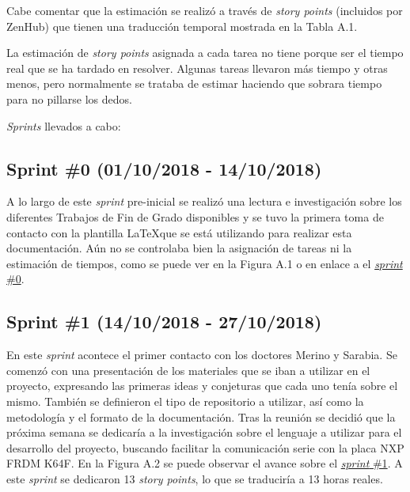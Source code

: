 Cabe comentar que la estimación se realizó a través de \textit{story points} (incluidos por ZenHub) que tienen una traducción temporal mostrada en la Tabla A.1.


La estimación de \textit{story points} asignada a cada tarea no tiene porque ser el tiempo real que se ha tardado en resolver. Algunas tareas llevaron más tiempo y otras menos, pero normalmente se trataba de estimar haciendo que sobrara tiempo para no pillarse los dedos. 

\textit{Sprints} llevados a cabo:

\subsection{Sprint \#0 (01/10/2018 - 14/10/2018)}

A lo largo de este \textit{sprint} pre-inicial se realizó una lectura e investigación sobre los diferentes Trabajos de Fin de Grado disponibles  y se tuvo la primera toma de contacto con la plantilla \LaTeX  que se está utilizando para realizar esta documentación. Aún no se controlaba bien la asignación de tareas ni la estimación de tiempos, como se puede ver en la Figura A.1 o en enlace a el \href{https://github.com/FranBurgos/TFG/milestone/1?closed=1}{\textit{sprint} \#0}.


\subsection{Sprint \#1 (14/10/2018 - 27/10/2018)}

En este \textit{sprint} acontece el primer contacto con los doctores Merino y Sarabia. Se comenzó con una presentación de los materiales que se iban a utilizar en el proyecto, expresando las primeras ideas y conjeturas que cada uno tenía sobre el mismo. También se definieron el tipo de repositorio a utilizar, así como la metodología y el formato de la documentación. Tras la reunión se decidió que la próxima semana se dedicaría a la investigación sobre el lenguaje a utilizar para el desarrollo del proyecto, buscando facilitar la comunicación serie con la placa NXP FRDM K64F. En la Figura A.2 se puede observar el avance sobre el \href{https://github.com/FranBurgos/TFG/milestone/2?closed=1}{\textit{sprint} \#1}.  A este \textit{sprint} se dedicaron 13 \textit{story points}, lo que se traduciría a 13 horas reales.


